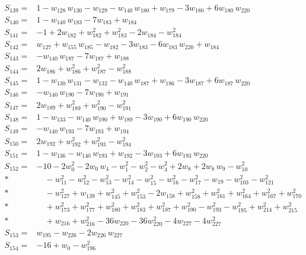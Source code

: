 \documentclass[11pt]{article}
\theoremstyle{remark}\newtheorem{remark}[theorem]{Remark}
\begin{document}
\begin{align*}
S_{139}={}& 1 - w_{128}\,w_{130} - w_{129} - w_{140}\,w_{180} + w_{179} - 3w_{180} + 6w_{180}\,w_{220} \\[2pt]
S_{140}={}& 1 - w_{140}\,w_{183} - 7w_{183} + w_{184} \\[2pt]
S_{141}={}& -1 + 2w_{182} + w_{182}^{2} + w_{183}^{2} - 2w_{184} - w_{184}^{2} \\[2pt]
S_{142}={}& w_{127} + w_{155}\,w_{185} - w_{182} - 3w_{183} - 6w_{183}\,w_{220} + w_{184} \\[2pt]
S_{143}={}& -w_{140}\,w_{187} - 7w_{187} + w_{188} \\[2pt]
S_{144}={}& 2w_{186} + w_{186}^{2} + w_{187}^{2} - w_{188}^{2} \\[2pt]
S_{145}={}& 1 - w_{130}\,w_{131} - w_{132} - w_{140}\,w_{187} + w_{186} - 3w_{187} + 6w_{187}\,w_{220} \\[2pt]
S_{146}={}& -w_{140}\,w_{190} - 7w_{190} + w_{191} \\[2pt]
S_{147}={}& 2w_{189} + w_{189}^{2} + w_{190}^{2} - w_{191}^{2} \\[2pt]
S_{148}={}& 1 - w_{133} - w_{140}\,w_{190} + w_{189} - 3w_{190} + 6w_{190}\,w_{220} \\[2pt]
S_{149}={}& -w_{140}\,w_{193} - 7w_{193} + w_{194} \\[2pt]
S_{150}={}& 2w_{192} + w_{192}^{2} + w_{193}^{2} - w_{194}^{2} \\[2pt]
S_{151}={}& 1 - w_{136} - w_{140}\,w_{193} + w_{192} - 3w_{193} + 6w_{193}\,w_{220} \\[2pt]
S_{152}={}& -10 - 2w_{0}^{2} - 2w_{0}\,w_{4} - w_{1}^{2} - w_{2}^{2} - w_{4}^{2} + 2w_{8} + 2w_{8}\,w_{9} - w_{10}^{2} \\*
&\quad  - w_{11}^{2} - w_{12}^{2} - w_{13}^{2} - w_{14}^{2} - w_{15}^{2} - w_{16}^{2} - w_{17}^{2} - w_{19} - w_{103}^{2} - w_{121}^{2} \\*
&\quad  - w_{127}^{2} + w_{139} + w_{145}^{2} + w_{153}^{2} - 2w_{158} + w_{158}^{2} + w_{161}^{2} + w_{164}^{2} + w_{167}^{2} + w_{170}^{2} \\*
&\quad  + w_{173}^{2} + w_{177}^{2} + w_{180}^{2} + w_{183}^{2} + w_{187}^{2} + w_{190}^{2} - w_{193}^{2} - w_{195}^{2} + w_{214}^{2} + w_{215}^{2} \\*
&\quad  + w_{216} + w_{216}^{2} - 36w_{220} - 36w_{220}^{2} - 4w_{227} - 4w_{227}^{2} \\[2pt]
S_{153}={}& w_{195} - w_{226} - 2w_{226}\,w_{227} \\[2pt]
S_{154}={}& -16 + w_{0} - w_{196}^{2} \\[2pt]

\end{align*}
\end{document}
